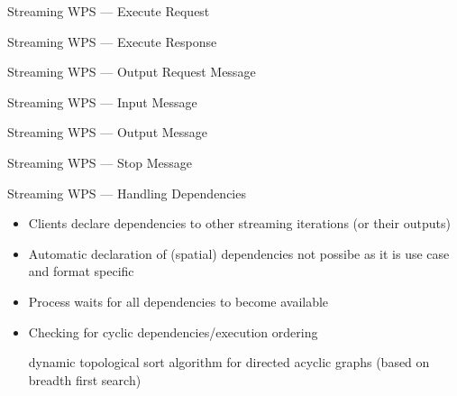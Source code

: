 \documentclass[xcolor=svgnames,professionalfonts,11pt,aspectratio=43]{beamer}
\begin{document}
\begin{frame}[c,fragile]{Streaming WPS --- Execute Request}
    \begin{center}
      
    \end{center}
\end{frame}

\begin{frame}[c,fragile]{Streaming WPS --- Execute Response}
    \begin{center}
      
    \end{center}
\end{frame}

\begin{frame}[c,fragile]{Streaming WPS --- Output Request Message}
    \begin{center}
      
    \end{center}
\end{frame}

\begin{frame}[c,fragile]{Streaming WPS --- Input Message}
    \begin{center}
      
    \end{center}
\end{frame}

\begin{frame}[c,fragile]{Streaming WPS --- Output Message}
    \begin{center}
      
    \end{center}
\end{frame}

\begin{frame}[c,fragile]{Streaming WPS --- Stop Message}
    \begin{center}
      
    \end{center}
\end{frame}

\begin{frame}[t]{Streaming WPS --- Handling Dependencies}
  \begin{itemize}
    \item Clients declare dependencies to other streaming iterations (or their outputs)
    \pause
    \item Automatic declaration of (spatial) dependencies not possibe as it is use case and format specific
    \pause
    \item Process waits for all dependencies to become available
    \pause
    \item Checking for cyclic dependencies/execution ordering
    \pause
    \begin{itemize}
      \arrow dynamic topological sort algorithm for directed acyclic graphs (based on breadth first search)
    \end{itemize}
  \end{itemize}
\end{frame}
\end{document}
